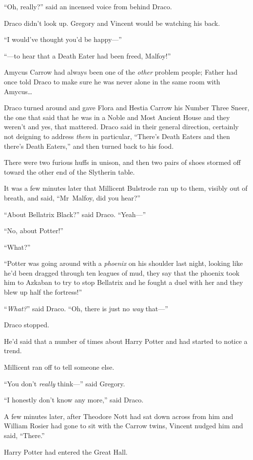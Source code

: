 “Oh, really?” said an incensed voice from behind Draco.

Draco didn’t look up. Gregory and Vincent would be watching his back.

“I would’ve thought you’d be happy—”

“—to hear that a Death Eater had been freed, Malfoy!”

Amycus Carrow had always been one of the \emph{other} problem people; Father had once told Draco to make sure he was never alone in the same room with Amycus…

Draco turned around and gave Flora and Hestia Carrow his Number Three Sneer, the one that said that he was in a Noble and Most Ancient House and they weren’t and yes, that mattered. Draco said in their general direction, certainly not deigning to address \emph{them} in particular, “There’s Death Eaters and then there’s Death Eaters,” and then turned back to his food.

There were two furious huffs in unison, and then two pairs of shoes stormed off toward the other end of the Slytherin table.

It was a few minutes later that Millicent Bulstrode ran up to them, visibly out of breath, and said, “Mr~Malfoy, did you hear?”

“About Bellatrix Black?” said Draco. “Yeah—”

“No, about Potter!”

“What?”

“Potter was going around with a \emph{phoenix} on his shoulder last night, looking like he’d been dragged through ten leagues of mud, they say that the phoenix took him to Azkaban to try to stop Bellatrix and he fought a duel with her and they blew up half the fortress!”

“\emph{What?}” said Draco. “Oh, there is just no \emph{way} that—”

Draco stopped.

He’d said that a number of times about Harry Potter and had started to notice a trend.

Millicent ran off to tell someone else.

“You don’t \emph{really} think—” said Gregory.

“I honestly don’t know any more,” said Draco.

A few minutes later, after Theodore Nott had sat down across from him and William Rosier had gone to sit with the Carrow twins, Vincent nudged him and said, “There.”

Harry Potter had entered the Great Hall.

